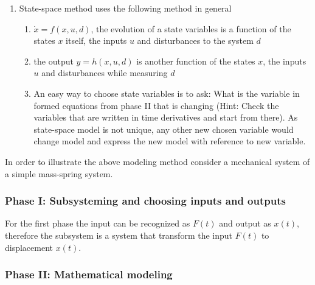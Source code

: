 \begin{enumerate}
\begin{enumerate}
		\item State-space method uses the following method in general
		\begin{enumerate}
			\item $\dot{x} = f(x,u,d)$, the evolution of a state variables is a function of the states $x$ itself, the inputs $u$ and disturbances to the system $d$
			\item the output $y = h(x,u,d)$ is another function of the states $x$, the inputs $u$ and disturbances while measuring $d$
			\item An easy way to choose state variables is to ask: What is the variable in formed equations from phase II that is changing (Hint: Check the variables that are written in time derivatives and start from there). As state-space model is not unique, any other new chosen variable would change model and express the new model with reference to new variable.
		\end{enumerate}
	\end{enumerate}
\end{enumerate}

In order to illustrate the above modeling method consider a mechanical system of a simple mass-spring system. 
\subsubsection{Phase I: Subsysteming and choosing inputs and outputs}

For the first phase the input can be recognized as $F(t)$ and output as $x(t)$, therefore the subsystem is a system that transform the input $F(t)$ to displacement $x(t)$.

\subsubsection{Phase II: Mathematical modeling}

